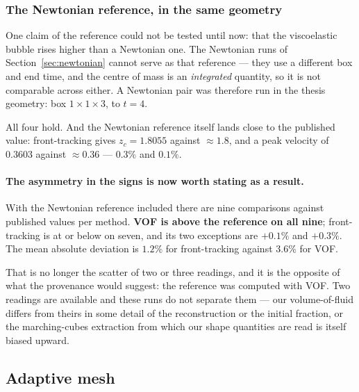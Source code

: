\subsubsection{The Newtonian reference, in the same geometry}

One claim of the reference could not be tested until now: that the viscoelastic
bubble rises higher than a Newtonian one. The Newtonian runs of
Section~\ref{sec:newtonian} cannot serve as that reference --- they use a
different box and end time, and the centre of mass is an \emph{integrated}
quantity, so it is not comparable across either. A Newtonian pair was therefore
run in the thesis geometry: box $1\times1\times3$, to $t=4$.

\begin{table}[htbp]
\centering
\caption{The trend claim, with a reference in the same geometry. Centre of mass
at $t=4$.}
\label{tab:vetendency}
\small
{}
\end{table}

All four hold. And the Newtonian reference itself lands close to the published
value: front-tracking gives $z_c = 1.8055$ against $\approx 1.8$, and a peak
velocity of $0.3603$ against $\approx 0.36$ --- $0.3\%$ and $0.1\%$.

\paragraph{The asymmetry in the signs is now worth stating as a result.}
With the Newtonian reference included there are nine comparisons against
published values per method. \textbf{VOF is above the reference on all nine};
front-tracking is at or below on seven, and its two exceptions are $+0.1\%$ and
$+0.3\%$. The mean absolute deviation is $1.2\%$ for front-tracking against
$3.6\%$ for VOF.

That is no longer the scatter of two or three readings, and it is the opposite
of what the provenance would suggest: the reference was computed with VOF. Two
readings are available and these runs do not separate them --- our
volume-of-fluid differs from theirs in some detail of the reconstruction or the
initial fraction, or the marching-cubes extraction from which our shape
quantities are read is itself biased upward. 

\subsection{Adaptive mesh}

